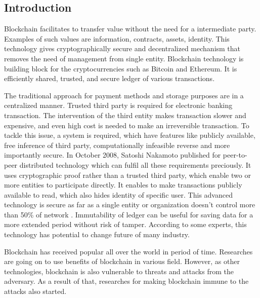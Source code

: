 \documentclass[a4paper,twoside,12pt]{report}
\begin{document}
\begin{spacing}{1.5}
\chapter{Introduction}
Blockchain facilitates to transfer value without the need for a intermediate party. Examples of such values are information, contracts, assets, identity. This technology gives cryptographically secure and decentralized mechanism that removes the need of management from single entity. Blockchain technology is building block for the cryptocurrencies such as Bitcoin and Ethereum. It is efficiently shared, trusted, and secure ledger of various transactions.  
\par
The traditional approach for payment methods and storage purposes are in a centralized manner. Trusted third party is required for electronic banking transaction. The intervention of the third entity makes transaction slower and expensive, and even high cost is needed to make an irreversible transaction. To tackle this issue, a system is required, which have features like publicly available, free inference of third party, computationally infeasible reverse and more importantly secure. In October 2008, Satoshi Nakamoto published for peer-to-peer distributed technology which can fulfil all these requirements preciously. It uses cryptographic proof rather than a trusted third party, which enable two or more entities to participate directly. It enables to make transactions publicly available to read, which also hides identity of specific user. This advanced technology is secure as far as a single entity or organization doesn't control more than 50\% of network \cite{satoshinakamoto}. Immutability of ledger can be useful for saving data for a more extended period without risk of tamper. According to some experts, this technology has potential to change future of many industry.
\par
Blockchain has received popular all over the world in period of time. Researches are going on to use benefits of blockchain in various field. However, as other technologies, blockchain is also vulnerable to threats and attacks from the adversary. As a result of that, researches for making blockchain immune to the attacks also started.         

\end{spacing}
\end{document}
